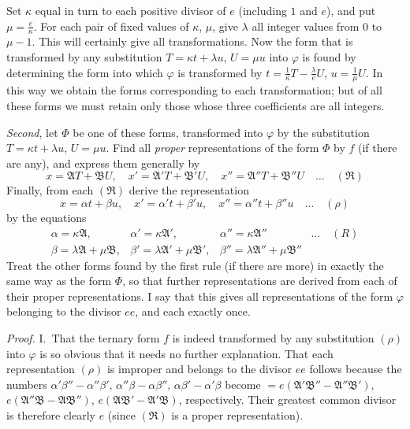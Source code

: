 Set $\kappa$ equal in turn to each positive divisor of $e$ (including
$1$ and $e$), and put $\mu=\frac{e}{\kappa}$. For each pair of fixed values
of $\kappa$, $\mu$, give $\lambda$ all integer values from $0$ to
$\mu-1$. This will certainly give all transformations. Now the form
that is transformed by any substitution $T=\kappa t+\lambda u$, $U=\mu u$ into $\varphi$
is found by determining the form into which $\varphi$ is transformed by
$t=\frac{1}{\kappa}T-\frac{\lambda}{e}U$, $u=\frac{1}{\mu}U$. In this way we obtain the forms corresponding to
each transformation; but of all these forms we must retain only those
whose three coefficients are all integers.

\textit{Second}, let $\Phi$ be one of these forms, transformed into
$\varphi$ by the substitution $T=\kappa t+\lambda u$, $U=\mu u$. Find all \textit{proper}
representations of the form $\Phi$ by $f$ (if there are any),
and express them generally by
\[
x=\mathfrak{A}T+\mathfrak{B}U,\quad x'=\mathfrak{A}'T+\mathfrak{B}'U,\quad x''=\mathfrak{A}''T+\mathfrak{B}''U\quad\ldots\quad(\mathfrak{R})
\]
Finally, from each $(\mathfrak{R})$ derive the representation
\[
x=\alpha t+\beta u,\quad x'=\alpha't+\beta'u,\quad x''=\alpha''t+\beta''u\quad\ldots\quad(\rho)
\]
by the equations
\[
\begin{array}{llll}
\alpha=\kappa\mathfrak{A},&\alpha'=\kappa\mathfrak{A}',&\alpha''=\kappa\mathfrak{A}''&\ldots\quad(R)\\
\beta=\lambda\mathfrak{A}+\mu\mathfrak{B},&\beta'=\lambda\mathfrak{A}'+\mu\mathfrak{B}',&\beta''=\lambda\mathfrak{A}''+\mu\mathfrak{B}''&
\end{array}
\]
Treat the other forms found by the first rule (if there are more) in exactly
the same way as the form $\Phi$, so that further representations are
derived from each of their proper representations. I say that this gives
all representations of the form $\varphi$ belonging to the divisor $ee$,
and each exactly once.

\textit{Proof.} I.\ That the ternary form $f$ is indeed transformed
by any substitution $(\rho)$ into $\varphi$ is so obvious that it needs
no further explanation. That each representation $(\rho)$ is improper
and belongs to the divisor $ee$ follows because the numbers $\alpha'\beta''-\alpha''\beta'$,
$\alpha''\beta-\alpha\beta''$, $\alpha\beta'-\alpha'\beta$ become $=e(\mathfrak{A}'\mathfrak{B}''-\mathfrak{A}''\mathfrak{B}')$, $e(\mathfrak{A}''\mathfrak{B}-\mathfrak{A}\mathfrak{B}'')$, $e(\mathfrak{A}\mathfrak{B}'-\mathfrak{A}'\mathfrak{B})$, respectively.
Their greatest common divisor is therefore clearly $e$ (since
$(\mathfrak{R})$ is a proper representation).

